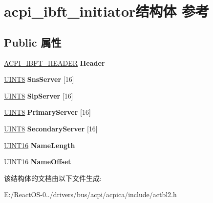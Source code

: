 \hypertarget{structacpi__ibft__initiator}{}\section{acpi\+\_\+ibft\+\_\+initiator结构体 参考}
\label{structacpi__ibft__initiator}
\subsection*{Public 属性}
\begin{DoxyCompactItemize}
\item 
\mbox{\label{structacpi__ibft__initiator_a232b5f32b3e4c130d8076cbed56e7bbb}} 
\hyperlink{structacpi__ibft__header}{A\+C\+P\+I\+\_\+\+I\+B\+F\+T\+\_\+\+H\+E\+A\+D\+ER} {\bfseries Header}
\item 
\mbox{\label{structacpi__ibft__initiator_a79c8db9ad5eda31b9b4ccc6f24a13682}} 
\hyperlink{_processor_bind_8h_ab27e9918b538ce9d8ca692479b375b6a}{U\+I\+N\+T8} {\bfseries Sns\+Server} \mbox{[}16\mbox{]}
\item 
\mbox{\label{structacpi__ibft__initiator_a757bb9cc70cea72e0de8835267d737d3}} 
\hyperlink{_processor_bind_8h_ab27e9918b538ce9d8ca692479b375b6a}{U\+I\+N\+T8} {\bfseries Slp\+Server} \mbox{[}16\mbox{]}
\item 
\mbox{\label{structacpi__ibft__initiator_a4d3b30105d34ce3b64a045f571ed9828}} 
\hyperlink{_processor_bind_8h_ab27e9918b538ce9d8ca692479b375b6a}{U\+I\+N\+T8} {\bfseries Primary\+Server} \mbox{[}16\mbox{]}
\item 
\mbox{\label{structacpi__ibft__initiator_a46ba34978c40e599bb22ff6705523a5d}} 
\hyperlink{_processor_bind_8h_ab27e9918b538ce9d8ca692479b375b6a}{U\+I\+N\+T8} {\bfseries Secondary\+Server} \mbox{[}16\mbox{]}
\item 
\mbox{\label{structacpi__ibft__initiator_a94fddb725f631cdc0363314e3ced5b3b}} 
\hyperlink{_processor_bind_8h_a09f1a1fb2293e33483cc8d44aefb1eb1}{U\+I\+N\+T16} {\bfseries Name\+Length}
\item 
\mbox{\label{structacpi__ibft__initiator_ad4db6c84da3a3b194d6357f8c11ed5d9}} 
\hyperlink{_processor_bind_8h_a09f1a1fb2293e33483cc8d44aefb1eb1}{U\+I\+N\+T16} {\bfseries Name\+Offset}
\end{DoxyCompactItemize}


该结构体的文档由以下文件生成\+:\begin{DoxyCompactItemize}
\item 
E\+:/\+React\+O\+S-\/0../drivers/bus/acpi/acpica/include/actbl2.\+h\end{DoxyCompactItemize}
